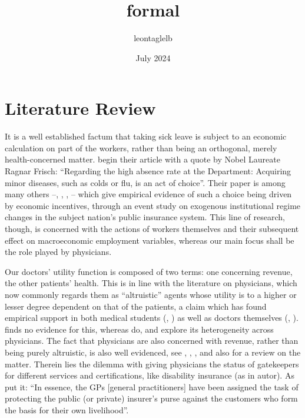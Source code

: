 \documentclass{article}
\title{formal}
\author{leontaglelb }
\date{July 2024}
\begin{document}
\maketitle

\section{Literature Review}


It is a well established factum that taking sick leave is subject to an economic calculation on part of the workers, rather than being an orthogonal, merely health-concerned matter. \cite{JohanssonPalme} begin their article with a quote by Nobel Laureate Ragnar Frisch: ``Regarding the high absence rate at the Department: Acquiring minor diseases, such as colds or flu, is an act of choice''. Their paper is among many others --\cite{italian-jobs}, \cite{norway-jobs}, \cite{us-jobs}, \cite{sweden-jobs}-- which give empirical evidence of such a choice being driven by economic incentives, through an event study on exogenous institutional regime changes in the subject nation's public insurance system. This line of research, though, is concerned with the actions of workers themselves and their subsequent effect on macroeconomic employment variables, whereas our main focus shall be the role played by physicians.

Our doctors' utility function is composed of two terms: one concerning revenue, the other patients' health. This is in line with the literature on physicians, which now commonly regards them as ``altruistic'' agents whose utility is to a higher or lesser degree dependent on that of the patients, a claim which has found empirical support in both medical students (\cite{avengers}, \cite{hs-wiesen}) as well as doctors themselves (\cite{hippocrates}, \cite{brosigkoch}). \cite{crea2019physician} finds no evidence for this, whereas \cite{godager2013profit} do, and explore its heterogeneity across physicians. The fact that physicians are also concerned with revenue, rather than being purely altruistic, is also well evidenced, see \cite{clemensgottlieb}, \cite{HSW}, \cite{autor}, and also \cite{rrk2012} for a review on the matter. Therein lies the dilemma with giving physicians the status of gatekeepers for different services and certifications, like disability insurance (as in autor). As \citet[p.~1]{markussen-roed} put it: ``In essence, the GPs [general practitioners] have been assigned the task of protecting the public (or private) insurer's purse against the customers who form the basis for their own livelihood''.
\end{document}
